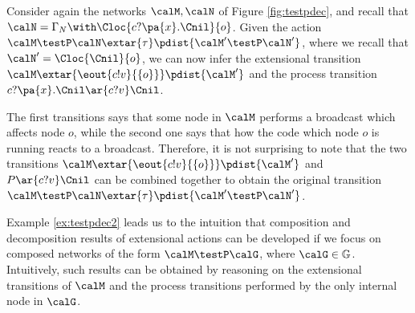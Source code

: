 \documentclass{LMCS}
\begin{document}
\begin{exa}
\label{ex:testpdec2}
Consider again the networks $\calM,\calN$ of Figure \ref{fig:testpdec}, and 
recall that $\calN = \Gamma_N \with \Cloc{c?\pa{x}.\Cnil}{o}$. Given the action 
$\calM \testP \calN \extar{\tau} \pdist{\calM' \testP \calN'}$, where 
we recall that $\calN' = \Cloc{\Cnil}{o}$, we can 
now infer the 
extensional transition $\calM \extar{\eout{c!v}{\{o\}}} \pdist{\calM'}$ 
and the process transition $c?\pa{x}.\Cnil \ar{c?v} \Cnil$.

The first transitions says that some node in $\calM$ performs 
a broadcast which affects node $o$, while the second one says that 
how the code which node $o$ is running reacts to a broadcast. 
Therefore, it is not surprising to note that the two 
transitions $\calM \extar{\eout{c!v}{\{o\}}} \pdist{\calM'}$ and 
$P \ar{c?v} \Cnil$ can be combined together to obtain 
the original transition $\calM \testP \calN \extar{\tau} \pdist{\calM' \testP \calN'}$.
\end{exa}

Example \ref{ex:testpdec2} leads us to the intuition that composition and decomposition 
results of extensional actions can be developed if we focus on composed networks of the 
form $\calM \testP \calG$, where $\calG \in \mathbb{G}$. Intuitively, 
such results can be obtained by reasoning on the 
extensional transitions of $\calM$ and the 
process transitions performed by the only internal node in $\calG$. 
\end{document}
